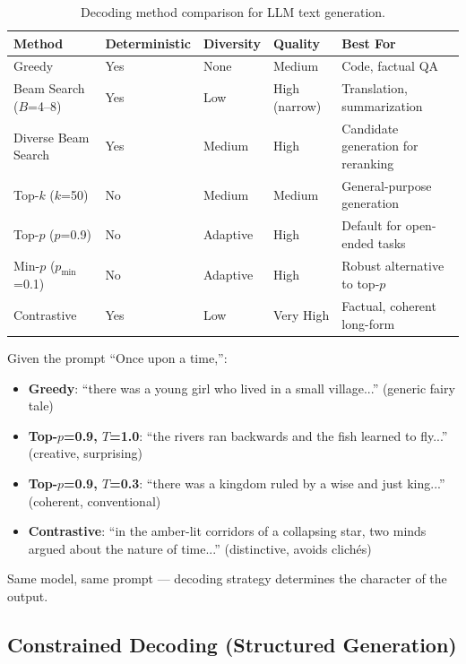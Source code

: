 \begin{table}[ht!]
\centering
\caption{Decoding method comparison for LLM text generation.}
\begin{tabular}{@{}lp{2.5cm}p{2.8cm}p{2.8cm}p{2.8cm}@{}}
\toprule
\textbf{Method} & \textbf{Deterministic} & \textbf{Diversity} & \textbf{Quality} & \textbf{Best For} \\
\midrule
Greedy & Yes & None & Medium & Code, factual QA \\
Beam Search ($B$=4--8) & Yes & Low & High (narrow) & Translation, summarization \\
Diverse Beam Search & Yes & Medium & High & Candidate generation for reranking \\
Top-$k$ ($k$=50) & No & Medium & Medium & General-purpose generation \\
Top-$p$ ($p$=0.9) & No & Adaptive & High & Default for open-ended tasks \\
Min-$p$ ($p_{\min}$=0.1) & No & Adaptive & High & Robust alternative to top-$p$ \\
Contrastive & Yes & Low & Very High & Factual, coherent long-form \\
\bottomrule
\end{tabular}
\end{table}

\begin{examplebox}
Given the prompt ``Once upon a time,'':

\begin{itemize}
  \item \textbf{Greedy}: ``there was a young girl who lived in a small village...'' (generic fairy tale)
  \item \textbf{Top-$p$=0.9, $T$=1.0}: ``the rivers ran backwards and the fish learned to fly...'' (creative, surprising)
  \item \textbf{Top-$p$=0.9, $T$=0.3}: ``there was a kingdom ruled by a wise and just king...'' (coherent, conventional)
  \item \textbf{Contrastive}: ``in the amber-lit corridors of a collapsing star, two minds argued about the nature of time...'' (distinctive, avoids clichés)
\end{itemize}

Same model, same prompt --- decoding strategy determines the character of the output.
\end{examplebox}

\subsection{Constrained Decoding (Structured Generation)}
\label{sec:constrained-decoding}

